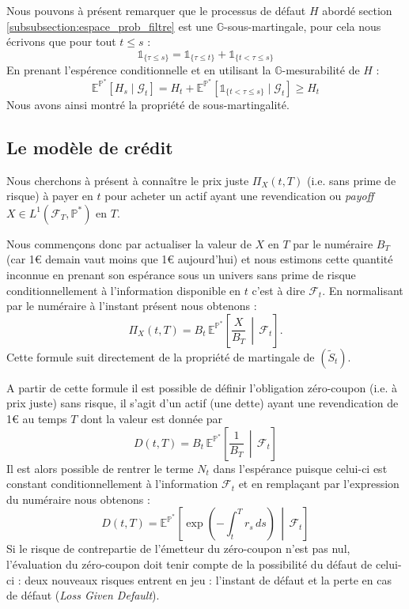 Nous pouvons à présent remarquer que le processus de défaut $H$ abordé section \ref{subsubsection:espace_prob_filtre}
est une $\mathbb{G}$-sous-martingale, pour cela nous écrivons que pour tout $t \le s$ :
\begin{equation}
    \mathbb{1}_{ \{ \tau \le s \} } = \mathbb{1}_{ \{ \tau \le t \} } + \mathbb{1}_{ \{ t < \tau \le s \} }
\end{equation}
En prenant l'espérence conditionnelle et en utilisant la $\mathbb{G}$-mesurabilité de $H$ :
\begin{equation}
    \mathbb{E}^{\mathbb{P}^*} [H_s \mid \mathcal{G}_t] =
    H_t + \mathbb{E}^{\mathbb{P}^*} [\mathbb{1}_{ \{ t < \tau \le s \} } \mid \mathcal{G}_t] \ge H_t
\end{equation}
Nous avons ainsi montré la propriété de sous-martingalité.

\subsection{Le modèle de crédit}

Nous cherchons à présent à connaître le prix juste $\Pi_X(t,T)$ (i.e. sans prime de risque) à payer
en $t$ pour acheter un actif ayant une revendication ou \emph{payoff} $X\in L^1(\mathcal{F}_T,\mathbb{P}^*)$
en $T$. 

Nous commençons donc par actualiser la valeur de $X$ en $T$ par le numéraire $B_T$ (car 1€ demain vaut moins que
1€ aujourd'hui) et nous estimons cette quantité inconnue en prenant son espérance sous un univers sans prime de
risque conditionnellement à l'information disponible en $t$ c'est à dire $\mathcal{F}_t$. En normalisant par le
numéraire à l'instant présent nous obtenons :
\begin{equation}
    \Pi_X(t,T) = B_t\, \mathbb{E}^{\mathbb{P}^*}\!\left[ \frac{X}{B_T} \,\middle|\, \mathcal{F}_t \right].
\end{equation}
Cette formule suit directement de la propriété de martingale de $(\tilde S_t)$.

A partir de cette formule il est possible de définir l'obligation zéro-coupon (i.e. à prix juste) sans risque,
il s'agit d'un actif (une dette) ayant une revendication de 1€ au temps $T$ dont la valeur est donnée par
\begin{equation}
    D(t,T) = B_t\, \mathbb{E}^{\mathbb{P}^*}\!\left[ \frac{1}{B_T} \,\middle|\, \mathcal{F}_t \right]
\end{equation}
Il est alors possible de rentrer le terme $N_t$ dans l'espérance puisque celui-ci est constant conditionnellement
à l'information $\mathcal{F}_t$ et en remplaçant par l'expression du numéraire nous obtenons :
\begin{equation}
    D(t,T) = \mathbb{E}^{\mathbb{P}^*}\!\left[ \exp\!\left(-\int_t^T r_s \, ds\right) \,\middle|\, \mathcal{F}_t \right]
\end{equation}
Si le risque de contrepartie de l'émetteur du zéro-coupon n'est pas nul, l'évaluation du
zéro-coupon doit tenir compte de la possibilité du défaut de celui-ci : deux nouveaux
risques entrent en jeu : l'instant de défaut et la perte en cas de défaut (\emph{Loss Given Default}).

